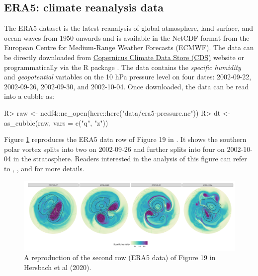 \documentclass[
]{jss}
\begin{document}
\hypertarget{era5-climate-reanalysis-data}{%
\subsection{ERA5: climate reanalysis data}\label{era5-climate-reanalysis-data}}

The ERA5 dataset \citep{hersbach2020era5} is the latest reanalysis of global atmosphere, land surface, and ocean waves from 1950 onwards and is available in the NetCDF format from the European Centre for Medium-Range Weather Forecasts (ECMWF). The data can be directly downloaded from \href{https://cds.climate.copernicus.eu/cdsapp\#!/dataset/reanalysis-era5-pressure-levels?tab=overview}{Copernicus Climate Data Store (CDS)} website or programmatically via the R package  \citep{ecwmfr}. The  data contains the \emph{specific humidity} and \emph{geopotential} variables on the 10 hPa pressure level on four dates: 2002-09-22, 2002-09-26, 2002-09-30, and 2002-10-04. Once downloaded, the data can be read into a cubble as:

\begin{CodeChunk}
\begin{CodeInput}
R> raw <- ncdf4::nc_open(here::here("data/era5-pressure.nc"))
R> dt <- as_cubble(raw, vars = c("q", "z"))
\end{CodeInput}
\end{CodeChunk}

Figure \ref{fig:netcdf} reproduces the ERA5 data row of Figure 19 in \citet{hersbach2020era5}. It shows the southern polar vortex splits into two on 2002-09-26 and further splits into four on 2002-10-04 in the stratosphere. Readers interested in the analysis of this figure can refer to \citet{hersbach2020era5}, \citet{simmons2020global}, and \citet{simmons2005ecmwf} for more details.

\begin{CodeChunk}
\begin{figure}

{\centering \includegraphics[width=1\linewidth]{../figures/netcdf} 

}

\caption[A reproduction of the second row (ERA5 data) of Figure 19 in Hersbach et al (2020)]{A reproduction of the second row (ERA5 data) of Figure 19 in Hersbach et al (2020).}\label{fig:netcdf}
\end{figure}
\end{CodeChunk}
\end{document}
